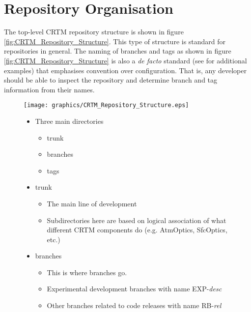 \section{Repository Organisation}
The top-level CRTM repository structure is shown in figure \ref{fig:CRTM_Repository_Structure}. This type of structure is standard for repositories in general\cite{SubversionManual,Mason2005}. The naming of branches and tags as shown in figure \ref{fig:CRTM_Repository_Structure} is also a \textit{de facto} standard (see \cite{Mason2005} for additional examples) that emphasises convention over configuration. That is, any developer should be able to inspect the repository and determine branch and tag information from their names.
\begin{figure}[htp]
  \hfill
  \begin{minipage}[t]{.475\textwidth}
    \begin{center}
      \texttt{[image: graphics/CRTM\_Repository\_Structure.eps]}
    \end{center}
  \end{minipage}
  \hfill
  \begin{minipage}[b]{.475\textwidth}
    \begin{itemize}
      \item Three main directories
        \begin{itemize}
          \item trunk
          \item branches
          \item tags
        \end{itemize}

      \item trunk
        \begin{itemize}
          \item The main line of development
          \item Subdirectories here are based on logical association of what different CRTM components do (e.g. AtmOptics, SfcOptics, etc.)
        \end{itemize}

      \item branches
        \begin{itemize}
          \item This is where branches go.
          \item Experimental development branches with name \textsf{EXP-}\emph{desc}
          \item Other branches related to code releases with name \textsf{RB}-\emph{rel}
        \end{itemize}


\end{itemize}
\end{minipage}
\end{figure}
